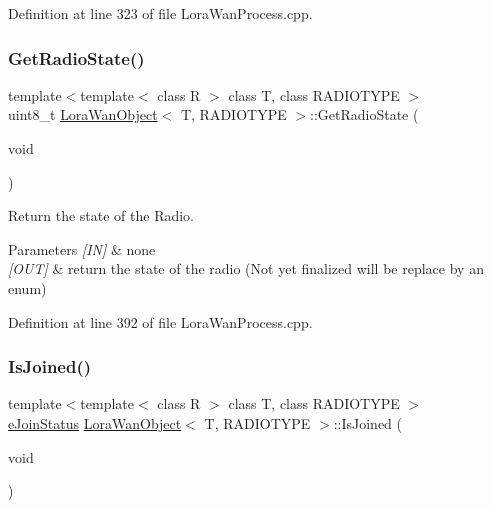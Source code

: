Definition at line 323 of file Lora\+Wan\+Process.\+cpp.

\mbox{\label{class_lora_wan_object_a3f4c1635a946635fdffa4af569ce5f27}} 
\subsubsection{\texorpdfstring{Get\+Radio\+State()}{GetRadioState()}}
{\footnotesize\ttfamily template$<$template$<$ class R $>$ class T, class R\+A\+D\+I\+O\+T\+Y\+PE $>$ \\
uint8\+\_\+t \mbox{\hyperlink{class_lora_wan_object}{Lora\+Wan\+Object}}$<$ T, R\+A\+D\+I\+O\+T\+Y\+PE $>$\+::Get\+Radio\+State (\begin{DoxyParamCaption}\item[{void}]{ }\end{DoxyParamCaption})}



Return the state of the Radio. 


\begin{DoxyParams}{Parameters}
{\em \mbox{[}\+I\+N\mbox{]}} & none \\
\hline
{\em \mbox{[}\+O\+U\+T\mbox{]}} & return the state of the radio (Not yet finalized will be replace by an enum) \\
\hline
\end{DoxyParams}


Definition at line 392 of file Lora\+Wan\+Process.\+cpp.

\mbox{\label{class_lora_wan_object_a0dc910d02d115bea5900567001fd2b77}} 
\subsubsection{\texorpdfstring{Is\+Joined()}{IsJoined()}}
{\footnotesize\ttfamily template$<$template$<$ class R $>$ class T, class R\+A\+D\+I\+O\+T\+Y\+PE $>$ \\
\mbox{\hyperlink{_define_8h_abe3daafdb4fec314926c12003b3ad390}{e\+Join\+Status}} \mbox{\hyperlink{class_lora_wan_object}{Lora\+Wan\+Object}}$<$ T, R\+A\+D\+I\+O\+T\+Y\+PE $>$\+::Is\+Joined (\begin{DoxyParamCaption}\item[{void}]{ }\end{DoxyParamCaption})}



